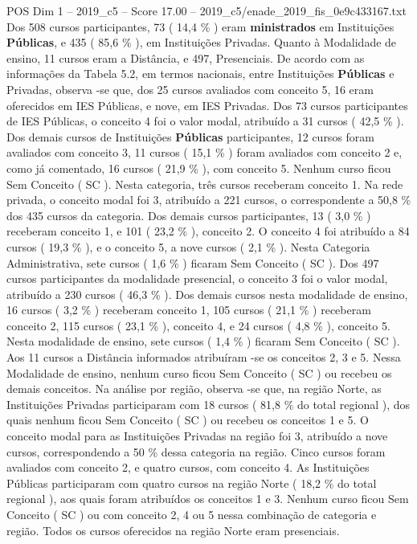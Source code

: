 \begin{textsample}{POS Dim 1 – 2019\_c5 – Score 17.00 – 2019\_c5/enade\_2019\_fis\_0e9c433167.txt}
Dos 508 cursos participantes, 73 ( 14,4 \% ) eram \textbf{ministrados} em Instituições \textbf{Públicas}, e 435 ( 85,6 \% ), em Instituições Privadas.
Quanto à Modalidade de ensino, 11 cursos eram a Distância, e 497, Presenciais.
De acordo com as informações da Tabela 5.2, em termos nacionais, entre Instituições \textbf{Públicas} e Privadas, observa -se que, dos 25 cursos avaliados com conceito 5, 16 eram oferecidos em IES Públicas, e nove, em IES Privadas.
Dos 73 cursos participantes de IES Públicas, o conceito 4 foi o valor modal, atribuído a 31 cursos ( 42,5 \% ).
Dos demais cursos de Instituições \textbf{Públicas} participantes, 12 cursos foram avaliados com conceito 3, 11 cursos ( 15,1 \% ) foram avaliados com conceito 2 e, como já comentado, 16 cursos ( 21,9 \% ), com conceito 5.
Nenhum curso ficou Sem Conceito ( SC ).
Nesta categoria, três cursos receberam conceito 1.
Na rede privada, o conceito modal foi 3, atribuído a 221 cursos, o correspondente a 50,8 \% dos 435 cursos da categoria.
Dos demais cursos participantes, 13 ( 3,0 \% ) receberam conceito 1, e 101 ( 23,2 \% ), conceito 2.
O conceito 4 foi atribuído a 84 cursos ( 19,3 \% ), e o conceito 5, a nove cursos ( 2,1 \% ).
Nesta Categoria Administrativa, sete cursos ( 1,6 \% ) ficaram Sem Conceito ( SC ).
Dos 497 cursos participantes da modalidade presencial, o conceito 3 foi o valor modal, atribuído a 230 cursos ( 46,3 \% ).
Dos demais cursos nesta modalidade de ensino, 16 cursos ( 3,2 \% ) receberam conceito 1, 105 cursos ( 21,1 \% ) receberam conceito 2, 115 cursos ( 23,1 \% ), conceito 4, e 24 cursos ( 4,8 \% ), conceito 5.
Nesta modalidade de ensino, sete cursos ( 1,4 \% ) ficaram Sem Conceito ( SC ).
Aos 11 cursos a Distância informados atribuíram -se os conceitos 2, 3 e 5.
Nessa Modalidade de ensino, nenhum curso ficou Sem Conceito ( SC ) ou recebeu os demais conceitos.
Na análise por região, observa -se que, na região Norte, as Instituições Privadas participaram com 18 cursos ( 81,8 \% do total regional ), dos quais nenhum ficou Sem Conceito ( SC ) ou recebeu os conceitos 1 e 5.
O conceito modal para as Instituições Privadas na região foi 3, atribuído a nove cursos, correspondendo a 50 \% dessa categoria na região.
Cinco cursos foram avaliados com conceito 2, e quatro cursos, com conceito 4.
As Instituições Públicas participaram com quatro cursos na região Norte ( 18,2 \% do total regional ), aos quais foram atribuídos os conceitos 1 e 3.
Nenhum curso ficou Sem Conceito ( SC ) ou com conceito 2, 4 ou 5 nessa combinação de categoria e região.
Todos os cursos oferecidos na região Norte eram presenciais.

\end{textsample}

